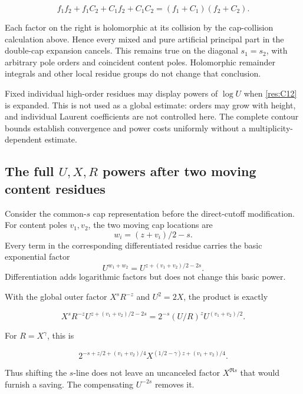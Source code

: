 \documentclass[11pt]{article}
\numberwithin{equation}{section}
\begin{document}
\begin{equation}\label{res:C16}
f_1f_2+f_1C_2+C_1f_2+C_1C_2
 =(f_1+C_1)(f_2+C_2).
\end{equation}

Each factor on the right is holomorphic at its collision by the
cap-collision calculation above. Hence every mixed and pure artificial
principal part in the double-cap expansion cancels. This remains true on
the diagonal \(s_1=s_2\), with arbitrary pole orders and coincident
content poles. Holomorphic remainder integrals and other local residue
groups do not change that conclusion.

Fixed individual high-order residues may display powers of \(\log U\)
when \eqref{res:C12} is expanded. This is not used as a global estimate:
orders may grow with height, and individual Laurent coefficients are not
controlled here. The complete contour bounds establish convergence and
power costs uniformly without a multiplicity-dependent estimate.

\subsection{\texorpdfstring{The full \(U,X,R\) powers after two moving
content
residues}{The full U,X,R powers after two moving content residues}}\label{the-full-uxr-powers-after-two-moving-content-residues}

Consider the common-\(s\) cap representation before the direct-cutoff
modification. For content poles \(v_1,v_2\), the two moving cap
locations are \[
 w_i=(z+v_i)/2-s.
\] Every term in the corresponding differentiated residue carries the
basic exponential factor \[
 U^{w_1+w_2}=U^{z+(v_1+v_2)/2-2s}.
\] Differentiation adds logarithmic factors but does not change this
basic power.

With the global outer factor \(X^sR^{-z}\) and \(U^2=2X\), the product
is exactly

\begin{equation}\label{res:C17}
X^sR^{-z}U^{z+(v_1+v_2)/2-2s}
 =2^{-s}(U/R)^zU^{(v_1+v_2)/2}.
\end{equation}

For \(R=X^\gamma\), this is

\begin{equation}\label{res:C18}
2^{-s+z/2+(v_1+v_2)/4}
 X^{(1/2-\gamma)z+(v_1+v_2)/4}.
\end{equation}

Thus shifting the \(s\)-line does not leave an uncanceled factor
\(X^{\Re s}\) that would furnish a saving. The compensating \(U^{-2s}\)
removes it.
\end{document}
